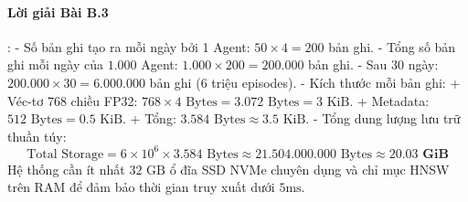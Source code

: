\paragraph{Lời giải Bài B.3}:
- Số bản ghi tạo ra mỗi ngày bởi 1 Agent: $50 \times 4 = 200$ bản ghi.
- Tổng số bản ghi mỗi ngày của $1.000$ Agent: $1.000 \times 200 = 200.000$ bản ghi.
- Sau 30 ngày: $200.000 \times 30 = 6.000.000$ bản ghi ($6$ triệu episodes).
- Kích thước mỗi bản ghi:
  + Véc-tơ 768 chiều FP32: $768 \times 4\text{ Bytes} = 3.072\text{ Bytes} = 3\text{ KiB}$.
  + Metadata: $512\text{ Bytes} = 0.5\text{ KiB}$.
  + Tổng: $3.584\text{ Bytes} \approx 3.5\text{ KiB}$.
- Tổng dung lượng lưu trữ thuần túy:
\begin{equation*}
\text{Total Storage} = 6 \times 10^6 \times 3.584\text{ Bytes} \approx 21.504.000.000\text{ Bytes} \approx \mathbf{20.03\text{ GiB}}
\end{equation*}
Hệ thống cần ít nhất $32\text{ GB}$ ổ đĩa SSD NVMe chuyên dụng và chỉ mục HNSW trên RAM để đảm bảo thời gian truy xuất dưới $5\text{ms}$.

